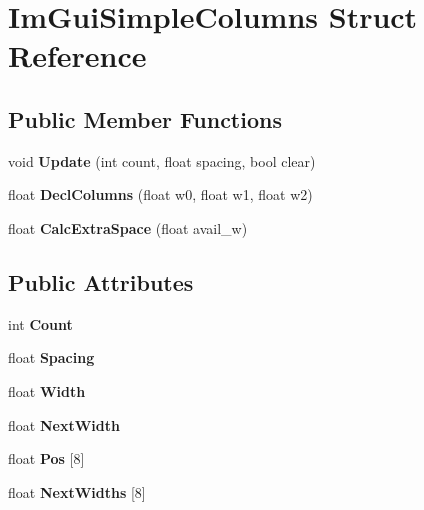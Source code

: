 \hypertarget{struct_im_gui_simple_columns}{}\section{Im\+Gui\+Simple\+Columns Struct Reference}
\label{struct_im_gui_simple_columns}
\subsection*{Public Member Functions}
\begin{DoxyCompactItemize}
\item 
\mbox{\label{struct_im_gui_simple_columns_a189662e328df2bf6947d9ab292f8ed21}} 
void {\bfseries Update} (int count, float spacing, bool clear)
\item 
\mbox{\label{struct_im_gui_simple_columns_a2daac4e4973ea1e9f2dda655206796fc}} 
float {\bfseries Decl\+Columns} (float w0, float w1, float w2)
\item 
\mbox{\label{struct_im_gui_simple_columns_aeebfea369d5f37b99f02ecd9ab2187ee}} 
float {\bfseries Calc\+Extra\+Space} (float avail\+\_\+w)
\end{DoxyCompactItemize}
\subsection*{Public Attributes}
\begin{DoxyCompactItemize}
\item 
\mbox{\label{struct_im_gui_simple_columns_ac5fdbd35f74c31992c95fc4b759e9c2f}} 
int {\bfseries Count}
\item 
\mbox{\label{struct_im_gui_simple_columns_aee2a43067de182ca1aa1447c8b658935}} 
float {\bfseries Spacing}
\item 
\mbox{\label{struct_im_gui_simple_columns_a3b7ed6f3aa04e3ead1ea17e4d9f92767}} 
float {\bfseries Width}
\item 
\mbox{\label{struct_im_gui_simple_columns_afa5623a5d27aadeb8c08d925b189397e}} 
float {\bfseries Next\+Width}
\item 
\mbox{\label{struct_im_gui_simple_columns_a3c13060fe3e4732512a663bb369f51d8}} 
float {\bfseries Pos} \mbox{[}8\mbox{]}
\item 
\mbox{\label{struct_im_gui_simple_columns_a5d2739196dc2df8626e32a0e373cdffe}} 
float {\bfseries Next\+Widths} \mbox{[}8\mbox{]}
\end{DoxyCompactItemize}


